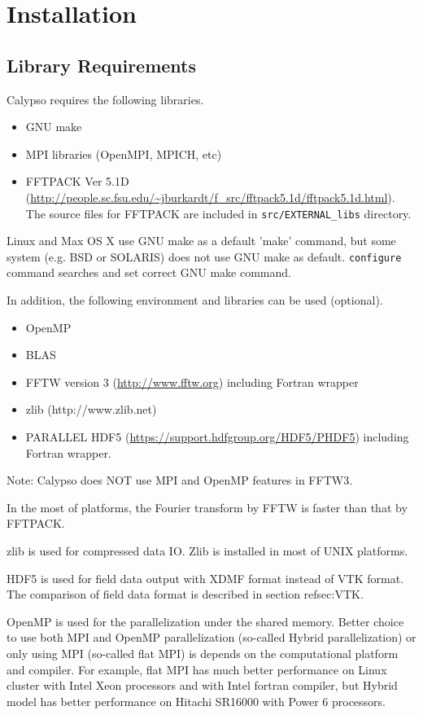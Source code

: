 \newpage
\section{Installation}


\subsection{Library Requirements}
\label{sec:requirements}
Calypso requires the following libraries.
\begin{itemize}
\item GNU make
\item MPI libraries (OpenMPI, MPICH, etc)
\item FFTPACK Ver 5.1D (\url{http://people.sc.fsu.edu/~jburkardt/f_src/fftpack5.1d/fftpack5.1d.html}). The source files for FFTPACK are included in {\tt src/EXTERNAL\_libs} directory.
\end{itemize}
Linux and Max OS X use GNU make as a default 'make' command, but some system (e.g. BSD or SOLARIS) does not use GNU make as default. \verb|configure| command searches and set correct GNU make command.

In addition, the following environment and libraries can be used (optional).
\begin{itemize}
\item OpenMP
\item BLAS
\item FFTW version 3 (\url{http://www.fftw.org}) including Fortran wrapper
\item zlib (http://www.zlib.net)
\item PARALLEL HDF5 (\url{https://support.hdfgroup.org/HDF5/PHDF5})  including Fortran wrapper.
\end{itemize}
Note: Calypso does NOT use MPI and OpenMP features in FFTW3. 

In the most of platforms, the Fourier transform by FFTW is faster than that by FFTPACK. 

zlib is used for compressed data IO. Zlib is installed in most of UNIX platforms.

HDF5 is used for field data output with XDMF format instead of VTK format. The comparison of field data format is described in section ref{sec:VTK}. 

OpenMP is used for the parallelization under the shared memory. Better choice to use both MPI and OpenMP parallelization (so-called Hybrid parallelization) or only using MPI (so-called flat MPI) is depends on the computational platform and compiler. For example, flat MPI has much better performance on Linux cluster with Intel Xeon processors and with Intel fortran compiler, but Hybrid model has better performance on Hitachi SR16000 with Power 6 processors.

